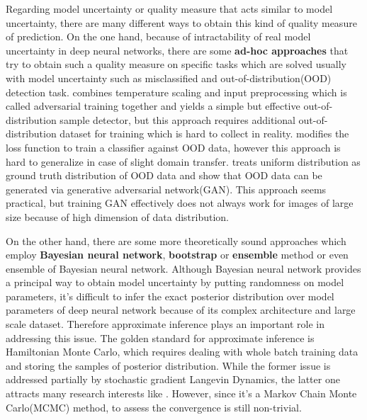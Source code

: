 Regarding model uncertainty or quality measure that acts similar to model uncertainty, there are many different ways to obtain this kind of quality measure of prediction. On the one hand, because of intractability of real model uncertainty in deep neural networks, there are some \textbf{ad-hoc approaches} that try to obtain such a quality measure on specific tasks which are solved usually with model uncertainty such as misclassified and out-of-distribution(OOD) detection task. \cite{liang2017enhancing} combines temperature scaling and input preprocessing which is called adversarial training together and yields a simple but effective out-of-distribution sample detector, but this approach requires additional out-of-distribution dataset for training which is hard to collect in reality. \cite{devries2018learning} modifies the loss function to train a classifier against OOD data, however this approach is hard to generalize in case of slight domain transfer. \cite{lee2017training} treats uniform distribution as ground truth distribution of OOD data and show that OOD data can be generated via generative adversarial network(GAN). This approach seems practical, but training GAN effectively does not always work for images of large size because of high dimension of data distribution. 

On the other hand, there are some more theoretically sound approaches which employ \textbf{Bayesian neural network}\cite{mackay1992practical}\cite{neal2012bayesian}, \textbf{bootstrap}\cite{osband2016deep} or \textbf{ensemble} method\cite{lakshminarayanan2017simple} or even ensemble of Bayesian neural network\cite{smith2018understanding}. Although Bayesian neural network provides a principal way to obtain model uncertainty by putting randomness on model parameters, it's difficult to infer the exact posterior distribution over model parameters of deep neural network because of its complex architecture and large scale dataset. Therefore approximate inference plays an important role in addressing this issue. The golden standard for approximate inference is Hamiltonian Monte Carlo\cite{neal2012bayesian}, which requires dealing with whole batch training data and storing the samples of posterior distribution. While the former issue is addressed partially by stochastic gradient Langevin Dynamics\cite{welling2011bayesian}, the latter one attracts many research interests like \cite{balan2015bayesian}\cite{wang2018adversarial}. However, since it's a Markov Chain Monte Carlo(MCMC) method, to assess the convergence is still non-trivial.
 
